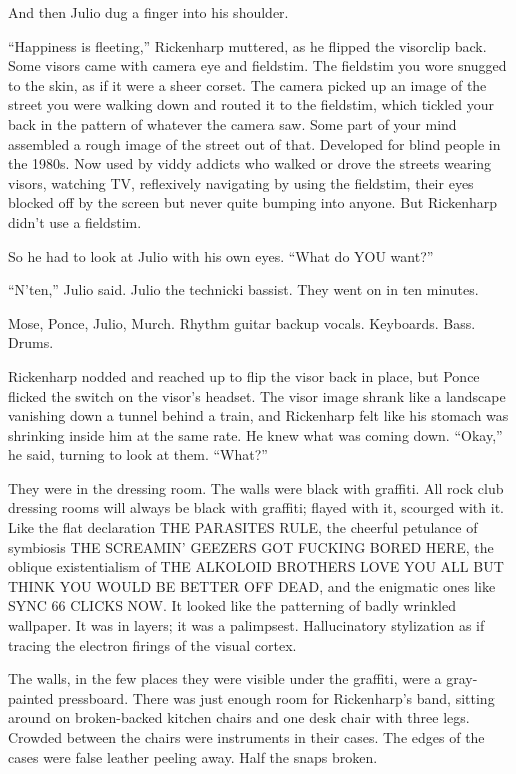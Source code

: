 And then Julio dug a finger into his shoulder.

“Happiness is fleeting,” Rickenharp muttered, as he flipped the visorclip back. Some visors came with camera eye and fieldstim. The fieldstim you wore snugged to the skin, as if it were a sheer corset. The camera picked up an image of the street you were walking down and routed it to the fieldstim, which tickled your back in the pattern of whatever the camera saw. Some part of your mind assembled a rough image of the street out of that. Developed for blind people in the 1980s. Now used by viddy addicts who walked or drove the streets wearing visors, watching TV, reflexively navigating by using the fieldstim, their eyes blocked off by the screen but never quite bumping into anyone. But Rickenharp didn’t use a fieldstim.

So he had to look at Julio with his own eyes. “What do YOU want?”

“N’ten,” Julio said. Julio the technicki bassist. They went on in ten minutes.

Mose, Ponce, Julio, Murch. Rhythm guitar backup vocals. Keyboards. Bass. Drums.

Rickenharp nodded and reached up to flip the visor back in place, but Ponce flicked the switch on the visor’s headset. The visor image shrank like a landscape vanishing down a tunnel behind a train, and Rickenharp felt like his stomach was shrinking inside him at the same rate. He knew what was coming down. “Okay,” he said, turning to look at them. “What?”

They were in the dressing room. The walls were black with graffiti. All rock club dressing rooms will always be black with graffiti; flayed with it, scourged with it. Like the flat declaration THE PARASITES RULE, the cheerful petulance of symbiosis THE SCREAMIN’ GEEZERS GOT FUCKING BORED HERE, the oblique existentialism of THE ALKOLOID BROTHERS LOVE YOU ALL BUT THINK YOU WOULD BE BETTER OFF DEAD, and the enigmatic ones like SYNC 66 CLICKS NOW. It looked like the patterning of badly wrinkled wallpaper. It was in layers; it was a palimpsest. Hallucinatory stylization as if tracing the electron firings of the visual cortex.

The walls, in the few places they were visible under the graffiti, were a gray-painted pressboard. There was just enough room for Rickenharp’s band, sitting around on broken-backed kitchen chairs and one desk chair with three legs. Crowded between the chairs were instruments in their cases. The edges of the cases were false leather peeling away. Half the snaps broken.

